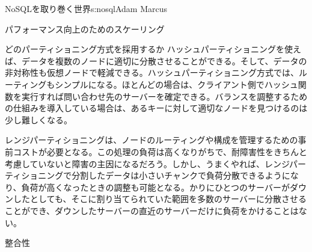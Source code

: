 \begin{aosachapter}{NoSQLを取り巻く世界}{s:nosql}{Adam Marcus}
\begin{aosasect1}{パフォーマンス向上のためのスケーリング}
\begin{aosasect2}{どのパーティショニング方式を採用するか}
ハッシュパーティショニングを使えば、データを複数のノードに適切に分散させることができる。そして、データの非対称性も仮想ノードで軽減できる。ハッシュパーティショニング方式では、ルーティングもシンプルになる。ほとんどの場合は、クライアント側でハッシュ関数を実行すれば問い合わせ先のサーバーを確定できる。バランスを調整するための仕組みを導入している場合は、あるキーに対して適切なノードを見つけるのは少し難しくなる。

レンジパーティショニングは、ノードのルーティングや構成を管理するための事前コストが必要となる。この処理の負荷は高くなりがちで、耐障害性をきちんと考慮していないと障害の主因になるだろう。しかし、うまくやれば、レンジパーティショニングで分割したデータは小さいチャンクで負荷分散できるようになり、負荷が高くなったときの調整も可能となる。かりにひとつのサーバーがダウンしたとしても、そこに割り当てられていた範囲を多数のサーバーに分散させることができ、ダウンしたサーバーの直近のサーバーだけに負荷をかけることはない。

\end{aosasect2}

\end{aosasect1}

\begin{aosasect1}{整合性}
\label{sec.nosql.consistency}


\end{aosasect1}
\end{aosachapter}
